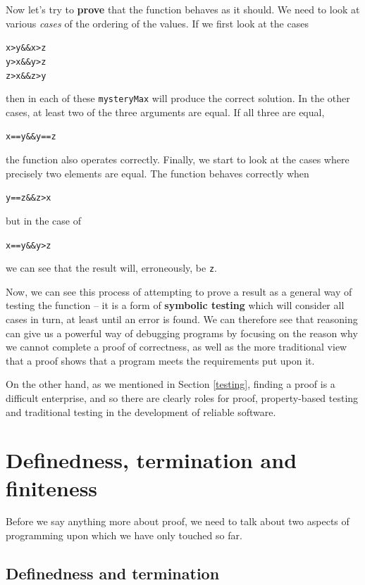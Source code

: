 Now let's try to \textbf{prove} that the function behaves as it should. 
We need to look at various \emph{cases} of
the ordering of the values. If we first look at the cases
\begin{alltt}
x > y \&\& x > z
y > x \&\& y > z
z > x \&\& z > y
\end{alltt} 
then in each of these \texttt{mysteryMax} will produce the correct
solution. In the other cases, at least two of the three arguments are equal. If all three 
are equal,
\begin{alltt}
x == y \&\& y == z
\end{alltt}
the function also operates correctly. Finally, we start to look at the
cases where precisely two elements are equal. The function behaves
correctly when
\begin{alltt}
y == z \&\& z > x
\end{alltt}
but in the case of
\begin{alltt}
x == y \&\& y > z
\end{alltt}
we can see that the result will, erroneously, be \texttt{z}. 

Now, we can
see this process of attempting to prove a result as a general way of
testing the function -- it is a form of \textbf{symbolic testing} which
will consider all cases in turn, at least until an error is found. We can therefore see that reasoning can give us a powerful way
of debugging programs by focusing on the reason why we cannot complete a proof of
correctness, as well as the more traditional view that a proof shows that a program 
meets the requirements put upon it.

On the other hand, as we mentioned in Section \ref{testing}, finding a proof is a
difficult enterprise, and so there are clearly roles for 
proof, property-based testing and traditional testing  in the development of reliable software. 


\section{Definedness, termination and finiteness}

Before we say anything more about proof, we need to talk about two aspects of
programming upon which we have only touched so far. 

\subsection*{Definedness and termination}


